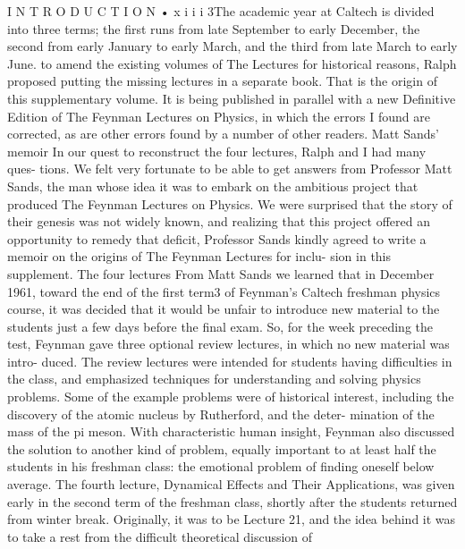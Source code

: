\documentclass[10pt,oneside]{article}
\begin{document}
I N T R O D U C T I O N • x i i i 3The academic year at Caltech is divided into three terms; the first runs from late September to early December, the second from early January to early March, and the third from late March to early June. to amend the existing volumes of The Lectures for historical reasons, Ralph proposed putting the missing lectures in a separate book. That is the origin of this supplementary volume. It is being published in parallel with a new Definitive Edition of The Feynman Lectures on Physics, in which the errors I found are corrected, as are other errors found by a number of other readers. Matt Sands’ memoir In our quest to reconstruct the four lectures, Ralph and I had many ques- tions. We felt very fortunate to be able to get answers from Professor Matt Sands, the man whose idea it was to embark on the ambitious project that produced The Feynman Lectures on Physics. We were surprised that the story of their genesis was not widely known, and realizing that this project offered an opportunity to remedy that deficit, Professor Sands kindly agreed to write a memoir on the origins of The Feynman Lectures for inclu- sion in this supplement. The four lectures From Matt Sands we learned that in December 1961, toward the end of the first term3 of Feynman’s Caltech freshman physics course, it was decided that it would be unfair to introduce new material to the students just a few days before the final exam. So, for the week preceding the test, Feynman gave three optional review lectures, in which no new material was intro- duced. The review lectures were intended for students having difficulties in the class, and emphasized techniques for understanding and solving physics problems. Some of the example problems were of historical interest, including the discovery of the atomic nucleus by Rutherford, and the deter- mination of the mass of the pi meson. With characteristic human insight, Feynman also discussed the solution to another kind of problem, equally important to at least half the students in his freshman class: the emotional problem of finding oneself below average. The fourth lecture, Dynamical Effects and Their Applications, was given early in the second term of the freshman class, shortly after the students returned from winter break. Originally, it was to be Lecture 21, and the idea behind it was to take a rest from the difficult theoretical discussion of\par
\end{document}
